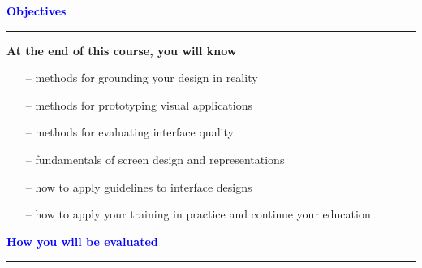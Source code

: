 \documentclass[pdf]{beamer}
\begin{document}
{{{{{{{%
{
\begin{frame}
	\vspace{8mm}
	\textcolor{Blue}{\textbf{\Large{Objectives}}}
    \textcolor{red}{\rule{10cm}{1mm}}
 
    \bigskip
    \textbf {At the end of this course, you will know}
    \begin{itemize}
    \bigskip
    	\item[{--}] methods for grounding your design in reality
        \bigskip
        \item[{--}] methods for prototyping visual applications 
        \bigskip
        \item[{--}] methods for evaluating interface quality
        \bigskip
        \item[{--}] fundamentals of screen design and representations
        \bigskip
        \item[{--}] how to apply guidelines to interface designs
        \bigskip
        \item[{--}] how to apply your training in practice and continue your
education
	\end{itemize}
    \bigskip
\end{frame}}



{
\begin{frame}
	\vspace{8mm}
	\textcolor{Blue}{\textbf{\Large{How you will be evaluated}}}
    \textcolor{red}{\rule{10cm}{1mm}}
 

\end{frame}}}}}}}}}
\end{document}
